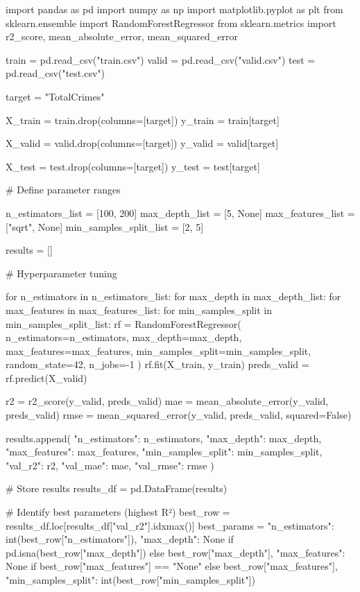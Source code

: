 import pandas as pd
import numpy as np
import matplotlib.pyplot as plt
from sklearn.ensemble import RandomForestRegressor
from sklearn.metrics import r2_score, mean_absolute_error, mean_squared_error

train = pd.read_csv("train.csv")
valid = pd.read_csv("valid.csv")
test = pd.read_csv("test.csv")

target = "TotalCrimes"

X_train = train.drop(columns=[target])
y_train = train[target]

X_valid = valid.drop(columns=[target])
y_valid = valid[target]

X_test = test.drop(columns=[target])
y_test = test[target]


# Define parameter ranges

n_estimators_list = [100, 200]
max_depth_list = [5, None]
max_features_list = ["sqrt", None]
min_samples_split_list = [2, 5]

results = []


# Hyperparameter tuning

for n_estimators in n_estimators_list:
    for max_depth in max_depth_list:
        for max_features in max_features_list:
            for min_samples_split in min_samples_split_list:
                rf = RandomForestRegressor(
                    n_estimators=n_estimators,
                    max_depth=max_depth,
                    max_features=max_features,
                    min_samples_split=min_samples_split,
                    random_state=42,
                    n_jobs=-1
                )
                rf.fit(X_train, y_train)
                preds_valid = rf.predict(X_valid)

                r2 = r2_score(y_valid, preds_valid)
                mae = mean_absolute_error(y_valid, preds_valid)
                rmse = mean_squared_error(y_valid, preds_valid, squared=False)

                results.append({
                    "n_estimators": n_estimators,
                    "max_depth": max_depth,
                    "max_features": max_features,
                    "min_samples_split": min_samples_split,
                    "val_r2": r2,
                    "val_mae": mae,
                    "val_rmse": rmse
                })

# Store results
results_df = pd.DataFrame(results)

# Identify best parameters (highest R²)
best_row = results_df.loc[results_df["val_r2"].idxmax()]
best_params = {
    "n_estimators": int(best_row["n_estimators"]),
    "max_depth": None if pd.isna(best_row["max_depth"]) else best_row["max_depth"],
    "max_features": None if best_row["max_features"] == "None" else best_row["max_features"],
    "min_samples_split": int(best_row["min_samples_split"])
}

